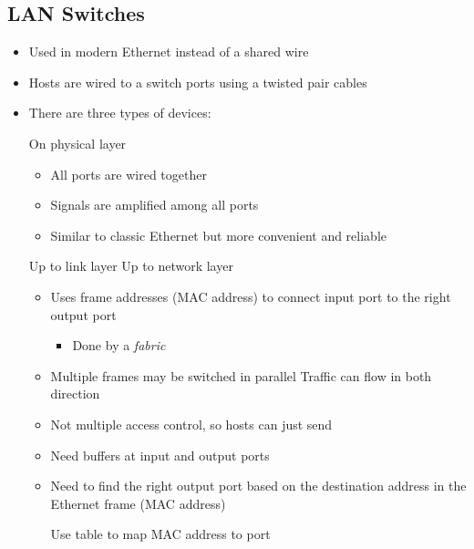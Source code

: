 \subsection{LAN Switches}
\begin{itemize}
    \item Used in modern Ethernet instead of a shared wire
    \item Hosts are wired to a switch ports using a twisted pair cables
    \item There are three types of devices:
        \begin{itemize}
             On physical layer
                \begin{itemize}
                    \item All ports are wired together
                    \item Signals are amplified among all ports
                    \item Similar to classic Ethernet but more convenient and reliable
                \end{itemize}
             Up to link layer
             Up to network layer
        \end{itemize}
        \begin{itemize}
            \item Uses frame addresses (MAC address) to connect input port to the right output port
                \begin{itemize}
                    \item Done by a \textit{fabric}
                \end{itemize}
            \item Multiple frames may be switched in parallel
             Traffic can flow in both direction
            \item Not multiple access control, so hosts can just send
            \item Need buffers at input and output ports
        \end{itemize}
        \begin{itemize}
            \item Need to find the right output port based on the destination address in the Ethernet frame (MAC address)
                \begin{itemize}
                     Use table to map MAC address to port

\end{itemize}
\end{itemize}
\end{itemize}
